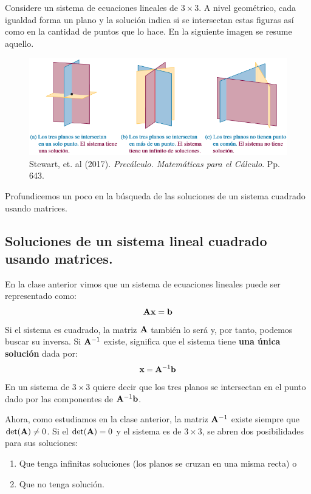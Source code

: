 \documentclass[12pt]{article}
\begin{document}
Considere un sistema de ecuaciones lineales de $3 \times 3$. A nivel geométrico, cada igualdad forma un plano y la solución indica si se intersectan estas figuras así como en la cantidad de puntos que lo hace. En la siguiente imagen se resume aquello.

\newpage

\begin{figure}[hbt!]
\centering
\includegraphics[scale=0.65]{numero-de-soluciones.png}
\caption{Stewart, et. al (2017). \textit{Precálculo. Matemáticas para el Cálculo}. Pp. 643.}
\end{figure}

Profundicemos un poco en la búsqueda de las soluciones de un sistema cuadrado usando matrices.

\subsection{Soluciones de un sistema lineal cuadrado usando matrices.}

En la clase anterior vimos que un sistema de ecuaciones lineales puede ser representado como:
\[
  \mathbf{A} \mathbf{x} = \mathbf{b}
\]
Si el sistema es cuadrado, la matriz $\mathbf{A}$ también lo será y, por tanto, podemos buscar su inversa. Si $\mathbf{A}^{-1}$ existe, significa que el sistema tiene \textbf{una única solución} dada por:
\[
  \mathbf{x} = \mathbf{A}^{-1} \mathbf{b}
\]
En un sistema de $3 \times 3$ quiere decir que los tres planos se intersectan en el punto dado por las componentes de $\mathbf{A}^{-1} \mathbf{b}$.

Ahora, como estudiamos en la clase anterior, la matriz $\mathbf{A}^{-1}$ existe siempre que $\det(\mathbf{A}) \neq 0$. Si el $\det(\mathbf{A}) = 0$ y el sistema es de $3 \times 3$, se abren dos posibilidades para sus soluciones:

\begin{enumerate}
\item Que tenga infinitas soluciones (los planos se cruzan en una misma recta) o
\item Que no tenga solución.
\end{enumerate}
\end{document}
